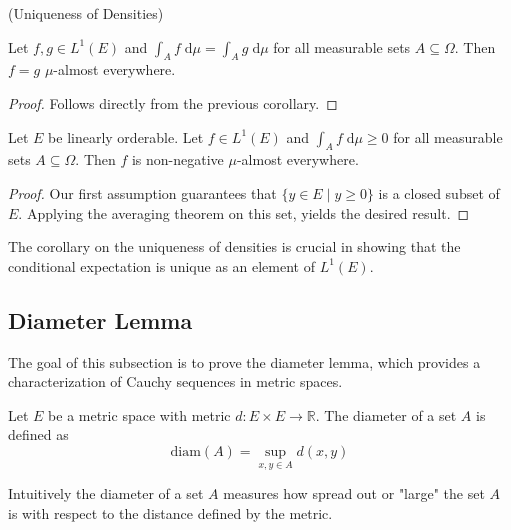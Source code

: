 \begin{corollary} (Uniqueness of Densities) \par
	Let $f, g \in L^1(E)$ and $\int_A f \;\textrm{d}\mu = \int_A g \;\textrm{d}\mu$ for all measurable sets $A \subseteq \Omega$. Then $f = g$ $\mu$-almost everywhere. 
\end{corollary}
\begin{proof}
	Follows directly from the previous corollary.
\end{proof}

\begin{corollary}
	Let $E$ be linearly orderable. Let $f \in L^1(E)$ and $\int_A f \;\textrm{d}\mu \ge 0$ for all measurable sets $A \subseteq \Omega$. Then $f$ is non-negative $\mu$-almost everywhere. 
\end{corollary}
\begin{proof}
	Our first assumption guarantees that $\{ y \in E \;\vert\; y \ge 0 \}$ is a closed subset of $E$. Applying the averaging theorem on this set, yields the desired result.
\end{proof}

The corollary on the uniqueness of densities is crucial in showing that the conditional expectation is unique as an element of $L^1(E)$.

\subsection{Diameter Lemma}

The goal of this subsection is to prove the diameter lemma, which provides a characterization of Cauchy sequences in metric spaces.

\begin{definition}
Let $E$ be a metric space with metric $d : E \times E \rightarrow \mathbb{R}$. The diameter of a set $A$ is defined as
\[
	\textrm{diam}(A) = \sup_{x,y \in A} d(x,y)
\]
\end{definition}

Intuitively the diameter of a set $A$ measures how spread out or "large" the set $A$ is with respect to the distance defined by the metric.

